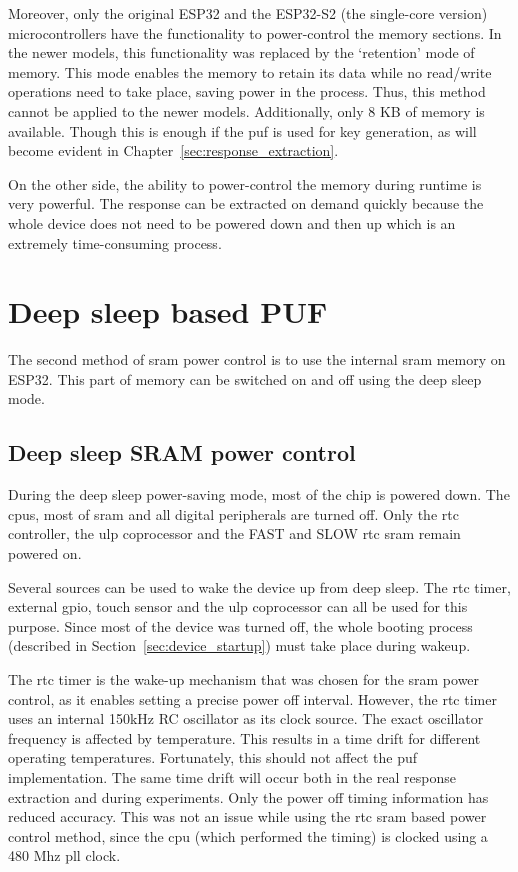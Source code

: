 Moreover, only the original ESP32 and the ESP32-S2 (the single-core version) microcontrollers have the functionality to power-control the memory sections. In the newer models, this functionality was replaced by the `retention' mode of memory. This mode enables the memory to retain its data while no read/write operations need to take place, saving power in the process.\cite{esp322021} Thus, this method cannot be applied to the newer models. Additionally, only 8 KB of memory is available. Though this is enough if the \gls{puf} is used for key generation, as will become evident in Chapter~\ref{sec:response_extraction}.

On the other side, the ability to power-control the memory during runtime is very powerful. The response can be extracted on demand quickly because the whole device does not need to be powered down and then up which is an extremely time-consuming process.

\section{Deep sleep based PUF}

The second method of \gls{sram} power control is to use the internal \gls{sram} memory on ESP32. This part of memory can be switched on and off using the deep sleep mode.

\subsection{Deep sleep SRAM power control}

During the deep sleep power-saving mode, most of the chip is powered down. The \glspl{cpu}, most of \gls{sram} and all digital peripherals are turned off. Only the \gls{rtc} controller, the \gls{ulp} coprocessor and the FAST and SLOW \gls{rtc} \gls{sram} remain powered on. 

Several sources can be used to wake the device up from deep sleep. The \gls{rtc} timer, external \gls{gpio}, touch sensor and the \gls{ulp} coprocessor can all be used for this purpose. Since most of the device was turned off, the whole booting process (described in Section~\ref{sec:device_startup}) must take place during wakeup.

The \gls{rtc} timer is the wake-up mechanism that was chosen for the \gls{sram} power control, as it enables setting a precise power off interval. However, the \gls{rtc} timer uses an internal 150kHz RC oscillator as its clock source. The exact oscillator frequency is affected by temperature. This results in a time drift for different operating temperatures. Fortunately, this should not affect the \gls{puf} implementation. The same time drift will occur both in the real response extraction and during experiments. Only the power off timing information has reduced accuracy. This was not an issue while using the \gls{rtc} \gls{sram} based power control method, since the \gls{cpu} (which performed the timing) is clocked using  a 480 Mhz \gls{pll} clock.\cite{esp322021}\cite{espidf2022}

